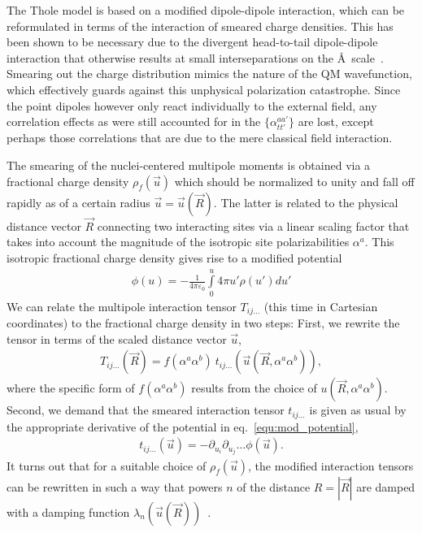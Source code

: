 The Thole model is based on a modified dipole-dipole interaction, which can be reformulated in terms of the interaction of smeared charge densities. This has been shown to be necessary due to the divergent head-to-tail dipole-dipole interaction that otherwise results at small interseparations on the \AA~scale~\cite{applequist_atom_1972, thole_molecular_1981, van_duijnen_molecular_1998}. Smearing out the charge distribution mimics the nature of the QM wavefunction, which effectively guards against this unphysical polarization catastrophe. Since the point dipoles however only react individually to the external field, any correlation effects as were still accounted for in the $\{\alpha_{tt'}^{aa'}\}$ are lost, except perhaps those correlations that are due to the mere classical field interaction.

The smearing of the nuclei-centered multipole moments is obtained via a fractional charge density $\rho_f(\vec{u})$ which should be normalized to unity and fall off rapidly as of a certain radius $\vec{u} = \vec{u}(\vec{R})$. The latter is related to the physical distance vector $\vec{R}$ connecting two interacting sites via a linear scaling factor that takes into account the magnitude of the isotropic site polarizabilities $\alpha^a$. This isotropic fractional charge density gives rise to a modified potential
\begin{align}
 \phi(u) = -\frac{1}{4\pi\varepsilon_0} \int \limits_{0}^{u} \! 4\pi u' \rho(u') d\!u' 
 \label{equ:mod_potential}
\end{align}
We can relate the multipole interaction tensor $T_{ij \dots}$ (this time in Cartesian coordinates) to the fractional charge density in two steps: First, we rewrite the tensor in terms of the scaled distance vector $\vec{u}$,
\begin{align}
 T_{ij \dots }(\vec{R}) = f(\alpha^a \alpha^b) \ t_{ij \dots}(\vec{u}(\vec{R},\alpha^a \alpha^b)),
\end{align}
where the specific form of $f(\alpha^a \alpha^b)$ results from the choice of $u(\vec{R},\alpha^a \alpha^b)$. Second, we demand that the smeared interaction tensor $t_{ij \dots}$ is given as usual by the appropriate derivative of the potential in eq.~\ref{equ:mod_potential},
\begin{align}
 t_{ij \dots}(\vec{u}) = - \partial_{u_i} \partial_{u_j} \dots \phi(\vec{u}).
\end{align}
It turns out that for a suitable choice of $\rho_f(\vec{u})$, the modified interaction tensors can be rewritten in such a way that powers $n$ of the distance $R = |\vec{R}|$ are damped with a damping function $\lambda_n(\vec{u}(\vec{R}))$~\cite{ren_polarizable_2003}.

